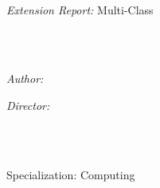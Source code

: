 \documentclass[
11pt, %
oneside, %
english, %
singlespacing, %
headsepline, %
table,
]{MastersDoctoralThesis} %
\author{Robert \textsc{Planas}} %
\begin{document}
\frontmatter %

\pagestyle{plain} %


\begin{titlepage}
\begin{center}

\vspace*{.06\textheight}
{\scshape\LARGE \univname\par}\vspace{0.5cm} %
\textsc{\Large \facname}\\[1.5cm] %
\Large{\emph{Extension Report:} Multi-Class}\\[0.5cm] %

\HRule \\[0.4cm] %
{\huge \bfseries \ttitle\par}\vspace{0.4cm} %
\HRule \\[1.5cm] %
 
\begin{minipage}[t]{0.4\textwidth}
\begin{flushleft} \large
\emph{Author:}\\
\href{http://www.hubbit86.com}{\authorname} %
\end{flushleft}
\end{minipage}
\begin{minipage}[t]{0.4\textwidth}
\begin{flushright} \large
\emph{Director:} \\
\href{https://www.cs.upc.edu/~belanche/}{\supname} %
\end{flushright}
\end{minipage}\\[4cm]

\vfill

\large \degreename\\ %
\large Specialization:  Computing\\[0.5cm] %


\end{center}
\end{titlepage}
\end{document}
